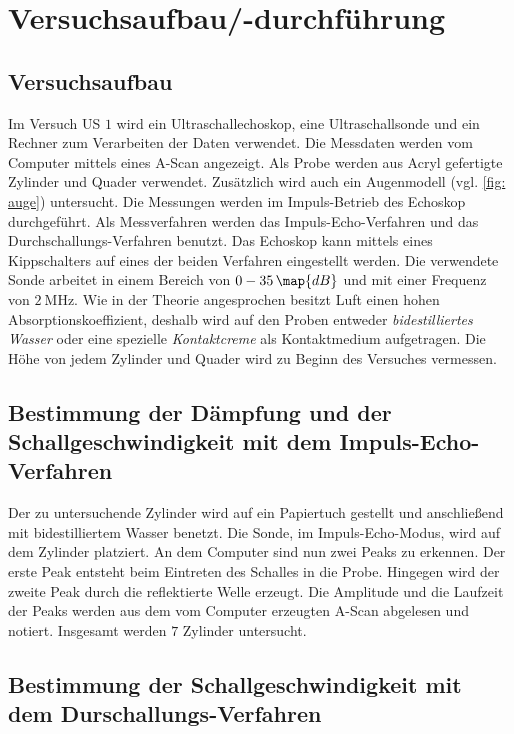 \section{Versuchsaufbau/-durchführung}

\subsection{Versuchsaufbau}
Im Versuch US $1$ wird ein Ultraschallechoskop, eine Ultraschallsonde und ein Rechner %
zum Verarbeiten der Daten verwendet.
Die Messdaten werden vom Computer mittels eines A-Scan angezeigt.
Als Probe werden aus Acryl gefertigte Zylinder und Quader verwendet.
Zusätzlich wird auch ein Augenmodell (vgl. \ref{fig: auge}) untersucht. %
Die Messungen werden im Impuls-Betrieb des Echoskop durchgeführt. Als Messverfahren werden
das Impuls-Echo-Verfahren und das Durchschallungs-Verfahren benutzt. Das Echoskop kann mittels
eines Kippschalters auf eines der beiden Verfahren eingestellt werden.
Die verwendete Sonde arbeitet in einem Bereich von $0-35\,\map{dB}$ und mit einer
Frequenz von $\SI{2}{\mega\hertz}$.
Wie in der Theorie angesprochen besitzt Luft einen hohen Absorptionskoeffizient, deshalb wird %
auf den Proben entweder \emph{bidestilliertes Wasser} oder eine spezielle \emph{Kontaktcreme} %
als Kontaktmedium aufgetragen.
Die Höhe von jedem Zylinder und Quader wird zu  Beginn des Versuches vermessen. %
\subsection{Bestimmung der Dämpfung und der Schallgeschwindigkeit mit dem Impuls-Echo-Verfahren}
Der zu untersuchende Zylinder wird auf ein Papiertuch gestellt und anschließend
mit bidestilliertem Wasser benetzt. Die Sonde, im Impuls-Echo-Modus, wird auf dem
Zylinder platziert. An dem Computer sind nun zwei Peaks zu erkennen. Der erste Peak
entsteht beim Eintreten des Schalles in die Probe. Hingegen wird der zweite Peak
durch die reflektierte Welle erzeugt. Die Amplitude und die Laufzeit der Peaks
werden aus dem vom Computer erzeugten A-Scan abgelesen und notiert.
Insgesamt werden $7$ Zylinder untersucht.

\subsection{Bestimmung der Schallgeschwindigkeit mit dem Durschallungs-Verfahren}

